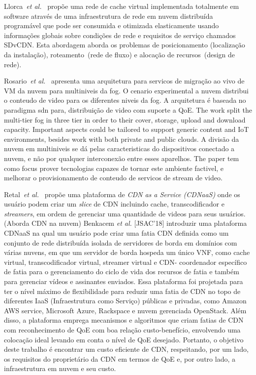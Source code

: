 Llorca~\textit{et al.}~\cite{llorcaICCW2015} propõe uma rede de cache virtual implementada totalmente em software através de uma infraestrutura de rede em nuvem distribuída programável que pode ser consumida e otimizada elasticamente usando informações globais sobre condições de rede e requisitos de serviço chamados SDvCDN. Esta abordagem aborda os problemas de posicionamento (localização da instalação), roteamento~(rede de fluxo) e alocação de recursos~(design de rede).

Rosario~\textit{et al.}~\cite{rosarioSENSORS2018} apresenta uma arquitetura para servicos de migração ao vivo de VM da nuvem para multiniveis da fog. O cenario experimental a nuvem distribui o conteudo de video para os diferentes niveis da fog. A arquitetura é baseada no paradigma sdn para, distribuição de video com suporte a QoE. 
The work split the multi-tier fog in three tier in order to their cover, storage, upload and download capacity. Important aspects could be tailored to support generic content and IoT environments, besides work with both private and public clouds. A divisão da nuvem em multiniveis se dá pelas caracteristicas do  dispositivos conectado a nuvem, e não por qualquer interconexão entre esses aparelhos. The paper tem como focus prover tecnologias capazes de tornar este ambiente factivel, e melhorar o provisionamento de conteudo de servicos de stream de video.


Retal~\textit{et al.}~\cite{retalICC2017} propõe uma plataforma de \textit{CDN as a Service (CDNaaS)} onde os usuário podem criar um \textit{slice} de CDN incluindo cache, transcodificador e \textit{streamers}, em ordem de gerenciar uma quantidade de videos para seus usuários. (Aborda CDN na nuvem)
Benkacem \textit{et al.} [JSAC'18] introduzir uma plataforma CDNaaS na qual um usuário pode criar uma fatia CDN definida como um conjunto de rede distribuída isolada de servidores de borda em domínios com várias nuvens, em que um servidor de borda hospeda um único VNF, como cache virtual, transcodificador virtual, streamer virtual e CDN- coordenador específico de fatia para o gerenciamento do ciclo de vida dos recursos de fatia e também para gerenciar vídeos e assinantes enviados. Essa plataforma foi projetada para ter o nível máximo de flexibilidade para reduzir uma fatia de CDN no topo de diferentes IaaS (Infraestrutura como Serviço) públicas e privadas, como Amazon AWS service, Microsoft Azure, Rackspace e nuvem gerenciada OpenStack. Além disso, a plataforma emprega mecanismos e algoritmos que criam fatias de CDN com reconhecimento de QoE com boa relação custo-benefício, envolvendo uma colocação ideal levando em conta o nível de QoE desejado. Portanto, o objetivo deste trabalho é encontrar um custo eficiente de CDN, respeitando, por um lado, os requisitos do proprietário da CDN em termos de QoE e, por outro lado, a infraestrutura em nuvem e seu custo.

